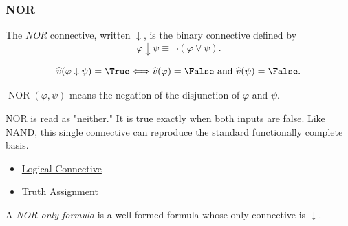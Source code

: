 \subsubsection*{NOR}

\begin{tcolorbox}[colback=propbox, colframe=propborder, arc=2pt,
  left=6pt, right=6pt, top=4pt, bottom=4pt,
  title={\small\textbf{Definition (NOR Connective)}},
  fonttitle=\small\bfseries]
\begin{definition}
\label{def:nor-connective-propositional-logic}
The \emph{NOR} connective, written \(\downarrow\), is the binary connective
defined by
\[
\varphi\downarrow\psi\equiv\neg(\varphi\lor\psi).
\]
\end{definition}
\end{tcolorbox}

\begin{remark*}
\[
\widehat v(\varphi\downarrow\psi)=\True
\Longleftrightarrow
\widehat v(\varphi)=\False\text{ and }\widehat v(\psi)=\False.
\]
\end{remark*}

\begin{remark*}
\(\operatorname{NOR}(\varphi,\psi)\) means the negation of the disjunction of
\(\varphi\) and \(\psi\).
\end{remark*}

\begin{remark*}[Interpretation]
NOR is read as "neither." It is true exactly when both inputs are false. Like
NAND, this single connective can reproduce the standard functionally complete
basis.
\end{remark*}

\begin{dependencies}
\begin{itemize}
  \item \hyperref[def:logical-connective]{Logical Connective}
  \item \hyperref[def:truth-assignment-propositional-logic]{Truth Assignment}
\end{itemize}
\end{dependencies}

\begin{tcolorbox}[colback=propbox, colframe=propborder, arc=2pt,
  left=6pt, right=6pt, top=4pt, bottom=4pt,
  title={\small\textbf{Definition (NOR-Only Formula)}},
  fonttitle=\small\bfseries]
\begin{definition}
\label{def:nor-only-formula-propositional-logic}
A \emph{NOR-only formula} is a well-formed formula whose only connective is
\(\downarrow\).
\end{definition}
\end{tcolorbox}

